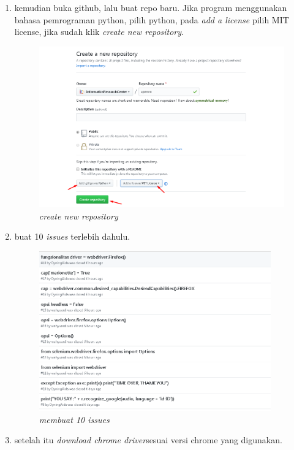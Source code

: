\begin{enumerate}
\item kemudian buka github, lalu buat repo baru. Jika program menggunakan bahasa pemrograman python, pilih python, pada \textit{add a license} pilih MIT license, jika sudah klik \textit{create new repository}.

\begin{figure}[!htbp]
    \centering
    \includegraphics[width=13cm]{figures/newrepo}
    \caption{\textit{create new repository}}
\end{figure} 

\newpage

\item buat 10 \textit{issues} terlebih dahulu.

\begin{figure}[!htbp]
    \centering
    \includegraphics[width=10cm]{figures/issues}
    \caption{\textit{membuat 10 issues}}
\end{figure} 

\item setelah itu \textit{download chrome driver}sesuai versi chrome yang digunakan.


\end{enumerate}
